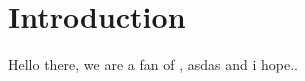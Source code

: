 
\chapter{Introduction}
\label{ch:Introduction}

Hello there, we are a fan of \citep{lesaffre_bayesian_2012}, asdas \cite{fruhwirth-schnatter_finite_2013} and i hope..